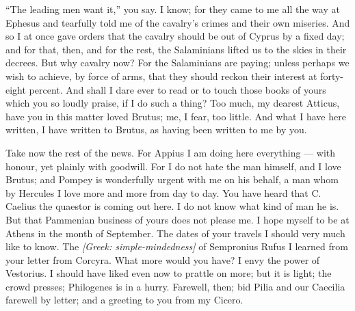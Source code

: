  ``The leading men want it,'' you say. I know; for they came to me all the way at Ephesus and tearfully told me of the cavalry's crimes and their own miseries. And so I at once gave orders that the cavalry should be out of Cyprus by a fixed day; and for that, then, and for the rest, the Salaminians lifted us to the skies in their decrees. But why cavalry now? For the Salaminians are paying; unless perhaps we wish to achieve, by force of arms, that they should reckon their interest at forty-eight percent. And shall I dare ever to read or to touch those books of yours which you so loudly praise, if I do such a thing? Too much, my dearest Atticus, have you in this matter loved Brutus; me, I fear, too little. And what I have here written, I have written to Brutus, as having been written to me by you.

 Take now the rest of the news. For Appius I am doing here everything --- with honour, yet plainly with goodwill. For I do not hate the man himself, and I love Brutus; and Pompey is wonderfully urgent with me on his behalf, a man whom by Hercules I love more and more from day to day. You have heard that C. Caelius the quaestor is coming out here. I do not know what kind of man he is. But that Pammenian business of yours does not please me. I hope myself to be at Athens in the month of September. The dates of your travels I should very much like to know. The \textit{[Greek: simple-mindedness]} of Sempronius Rufus I learned from your letter from Corcyra. What more would you have? I envy the power of Vestorius. I should have liked even now to prattle on more; but it is light; the crowd presses; Philogenes is in a hurry. Farewell, then; bid Pilia and our Caecilia farewell by letter; and a greeting to you from my Cicero.
